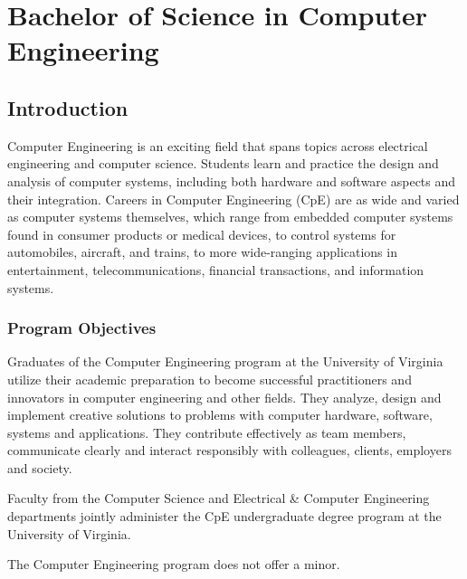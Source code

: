 \documentclass[10pt,letter]{book}
\newcommand{\mychapter}[2]{\chapter{#1}\renewcommand{\leftmark}{\textsc{#2}}}
\newcommand{\mysection}[1]{\section{#1}\renewcommand{\rightmark}{#1}}
\begin{document}
\clearpage
\mychapter{Bachelor of Science in Computer Engineering}{BS CpE Degree}

\mysection{Introduction}

Computer Engineering is an exciting field that spans topics across
electrical engineering and computer science.  Students learn and
practice the design and analysis of computer systems, including both
hardware and software aspects and their integration. Careers in
Computer Engineering (CpE) are as wide and varied as computer systems
themselves, which range from embedded computer systems found in
consumer products or medical devices, to control systems for
automobiles, aircraft, and trains, to more wide-ranging applications
in entertainment, telecommunications, financial transactions, and
information systems.


\subsection{Program Objectives}

Graduates of the Computer Engineering program at the
University of Virginia utilize their academic preparation
to become successful practitioners and innovators in
computer engineering and other fields. They analyze,
design and implement creative solutions to problems
with computer hardware, software, systems and
applications. They contribute effectively as team
members, communicate clearly and interact responsibly
with colleagues, clients, employers and society.

Faculty from the Computer Science and Electrical \& Computer
Engineering departments jointly administer the CpE undergraduate
degree program at the University of Virginia.

The Computer Engineering program does not offer a minor.

\end{document}
